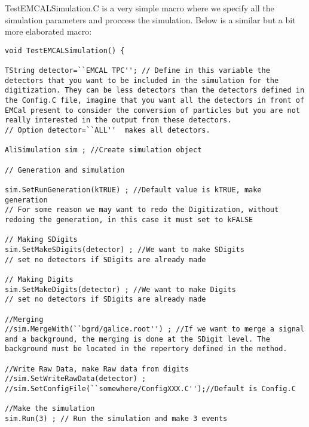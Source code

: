 TestEMCALSimulation.C is a very simple macro where we specify all the simulation parameters
and proccess the simulation. Below is a similar but a bit more elaborated macro:



\begin{DDbox}{\linewidth}
\begin{lstlisting}
void TestEMCALSimulation() {

TString detector=``EMCAL TPC''; // Define in this variable the detectors that you want to be included in the simulation for the digitization. They can be less detectors than the detectors defined in the Config.C file, imagine that you want all the detectors in front of EMCal present to consider the conversion of particles but you are not really interested in the output from these detectors. 
// Option detector=``ALL''  makes all detectors. 

AliSimulation sim ; //Create simulation object 

// Generation and simulation 

sim.SetRunGeneration(kTRUE) ; //Default value is kTRUE, make generation  
// For some reason we may want to redo the Digitization, without redoing the generation, in this case it must set to kFALSE 

// Making SDigits 
sim.SetMakeSDigits(detector) ; //We want to make SDigits
// set no detectors if SDigits are already made

// Making Digits 
sim.SetMakeDigits(detector) ; //We want to make Digits 
// set no detectors if SDigits are already made

//Merging 
//sim.MergeWith(``bgrd/galice.root'') ; //If we want to merge a signal and a background, the merging is done at the SDigit level. The background must be located in the repertory defined in the method. 

//Write Raw Data, make Raw data from digits 
//sim.SetWriteRawData(detector) ;
//sim.SetConfigFile(``somewhere/ConfigXXX.C'');//Default is Config.C

//Make the simulation 
sim.Run(3) ; // Run the simulation and make 3 events 



\end{lstlisting}
\end{DDbox}